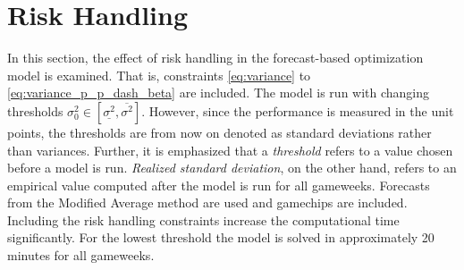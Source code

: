 \section{Risk Handling} \label{sec:res_risk_hand}

In this section, the effect of risk handling in the forecast-based optimization model is examined. That is, constraints \ref{eq:variance} to \ref{eq:variance_p_p_dash_beta} are included. The model is run with changing thresholds $\sigma_{0}^2 \in [\underline{\sigma^2}, \overline{\sigma^2}]$. However, since the performance is measured in the unit points, the thresholds are from now on denoted as standard deviations rather than variances. Further, it is emphasized that a \textit{threshold} refers to a value chosen before a model is run. \textit{Realized standard deviation}, on the other hand, refers to an empirical value computed after the model is run for all gameweeks. Forecasts from the Modified Average method are used and gamechips are included. Including the risk handling constraints increase the computational time significantly. For the lowest threshold the model is solved in approximately 20 minutes for all gameweeks.

